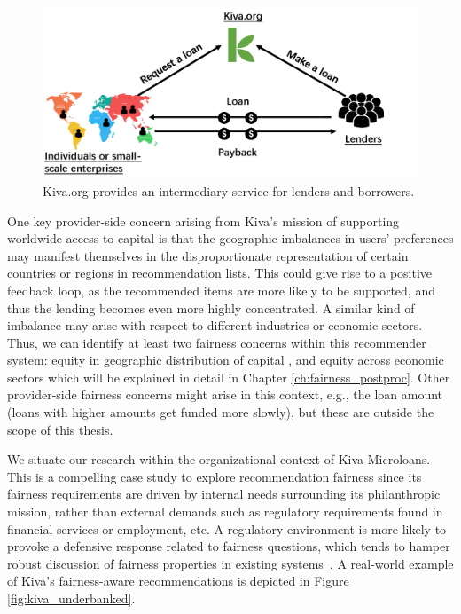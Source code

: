     \begin{figure}[htb]
    \includegraphics[width=0.98\columnwidth]{imgs/far/microlending.png}
    \caption{Kiva.org provides an intermediary service for lenders and borrowers.}
    \label{fig:kiva_process}
    \end{figure}
    
    
    One key provider-side concern arising from Kiva's mission of supporting worldwide access to capital is that the geographic imbalances in users' preferences may manifest themselves in the disproportionate representation of certain countries or regions in recommendation lists. This could give rise to a positive feedback loop, as the recommended items are more likely to be supported, and thus the lending becomes even more highly concentrated. A similar kind of imbalance may arise with respect to different industries or economic sectors. Thus, we can identify at least two fairness concerns within this recommender system: equity in geographic distribution of capital \cite{liu2019personalized}, and equity across economic sectors \cite{sonboli2020opportunistic} which will be explained in detail in Chapter \ref{ch:fairness_postproc}. Other provider-side fairness concerns might arise in this context, e.g., the loan amount (loans with higher amounts get funded more slowly), but these are outside the scope of this thesis.
    
    We situate our research within the organizational context of Kiva Microloans. This is a compelling case study to explore recommendation fairness since its fairness requirements are driven by internal needs surrounding its philanthropic mission, rather than external demands such as regulatory requirements found in financial services or employment, etc. A regulatory environment is more likely to provoke a defensive response related to fairness questions, which tends to hamper robust discussion of fairness properties in existing systems~\cite{chen2018fair,holstein2019improving}. A real-world example of Kiva's fairness-aware recommendations is depicted in Figure \ref{fig:kiva_underbanked}.
    
